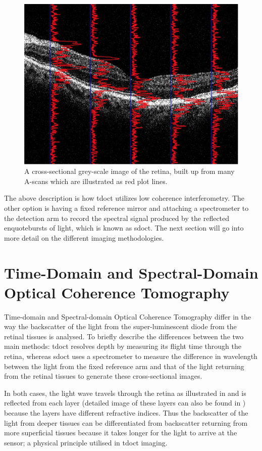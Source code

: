 \begin{figure}[H]
\centering
\includegraphics{figures/morgan_3}
\caption{A cross-sectional grey-scale image of the retina, built up from many A-scans which are illustrated as red plot lines. \cite{mbib_6} }
\label{fig:m_3}
\end{figure}


The above description is how \Gls{tdoct} utilizes low coherence interferometry.
The other option is having a fixed reference mirror and attaching a spectrometer to
the detection arm to record the spectral signal produced by the reflected
 enquote{bursts} of light, which is known as \Gls{sdoct}.\cite{mbib_3} The next
section will go into more detail on the different imaging methodologies.

\section{Time-Domain and Spectral-Domain Optical Coherence Tomography}
Time-domain and Spectral-domain Optical Coherence Tomography differ in the way
the backscatter of the light from the super-luminescent diode from the retinal
tissues is analysed.  To briefly describe the differences between the two main
methods: \Gls{tdoct} resolves depth by measuring its flight time through the retina,
whereas \Gls{sdoct} uses a spectrometer to measure the difference in wavelength
between the light from the fixed reference arm and that of the light returning
from the retinal tissues to generate these cross-sectional images.\cite{mbib_7}

In both cases, the light wave travels through the retina as illustrated in  and
is reflected from each layer (detailed image of these layers can also be
found in ) because the layers have different refractive indices.
Thus the backscatter of the light from deeper tissues can be differentiated from
backscatter returning from more superficial tissues because it takes longer for
the light to arrive at the sensor; a physical principle utilised in \Gls{tdoct}
imaging.\cite{mbib_4}

